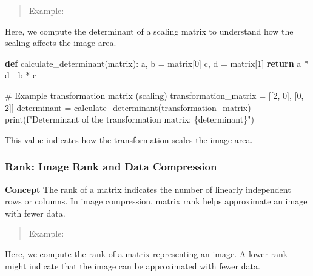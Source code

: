 \documentclass[
  letterpaper,
  DIV=11,
  numbers=noendperiod]{scrreprt}
\newenvironment{Shaded}{\begin{snugshade}}{\end{snugshade}}
\newcommand{\BuiltInTok}[1]{\textcolor[rgb]{0.00,0.23,0.31}{#1}}
\newcommand{\CommentTok}[1]{\textcolor[rgb]{0.37,0.37,0.37}{#1}}
\newcommand{\ControlFlowTok}[1]{\textcolor[rgb]{0.00,0.23,0.31}{\textbf{#1}}}
\newcommand{\DecValTok}[1]{\textcolor[rgb]{0.68,0.00,0.00}{#1}}
\newcommand{\KeywordTok}[1]{\textcolor[rgb]{0.00,0.23,0.31}{\textbf{#1}}}
\newcommand{\NormalTok}[1]{\textcolor[rgb]{0.00,0.23,0.31}{#1}}
\newcommand{\OperatorTok}[1]{\textcolor[rgb]{0.37,0.37,0.37}{#1}}
\newcommand{\SpecialCharTok}[1]{\textcolor[rgb]{0.37,0.37,0.37}{#1}}
\newcommand{\SpecialStringTok}[1]{\textcolor[rgb]{0.13,0.47,0.30}{#1}}
\theoremstyle{plain}
\theoremstyle{definition}
\theoremstyle{remark}
\begin{document}
\begin{quote}
Example:
\end{quote}

Here, we compute the determinant of a scaling matrix to understand how
the scaling affects the image area.

\begin{Shaded}
\begin{Highlighting}[]
\KeywordTok{def}\NormalTok{ calculate\_determinant(matrix):}
\NormalTok{    a, b }\OperatorTok{=}\NormalTok{ matrix[}\DecValTok{0}\NormalTok{]}
\NormalTok{    c, d }\OperatorTok{=}\NormalTok{ matrix[}\DecValTok{1}\NormalTok{]}
    \ControlFlowTok{return}\NormalTok{ a }\OperatorTok{*}\NormalTok{ d }\OperatorTok{{-}}\NormalTok{ b }\OperatorTok{*}\NormalTok{ c}

\CommentTok{\# Example transformation matrix (scaling)}
\NormalTok{transformation\_matrix }\OperatorTok{=}\NormalTok{ [[}\DecValTok{2}\NormalTok{, }\DecValTok{0}\NormalTok{], [}\DecValTok{0}\NormalTok{, }\DecValTok{2}\NormalTok{]]}
\NormalTok{determinant }\OperatorTok{=}\NormalTok{ calculate\_determinant(transformation\_matrix)}
\BuiltInTok{print}\NormalTok{(}\SpecialStringTok{f"Determinant of the transformation matrix: }\SpecialCharTok{\{}\NormalTok{determinant}\SpecialCharTok{\}}\SpecialStringTok{"}\NormalTok{)}
\end{Highlighting}
\end{Shaded}

This value indicates how the transformation scales the image area.

\subsubsection{Rank: Image Rank and Data
Compression}\label{rank-image-rank-and-data-compression}

\textbf{Concept} The rank of a matrix indicates the number of linearly
independent rows or columns. In image compression, matrix rank helps
approximate an image with fewer data.

\begin{quote}
Example:
\end{quote}

Here, we compute the rank of a matrix representing an image. A lower
rank might indicate that the image can be approximated with fewer data.
\end{document}
